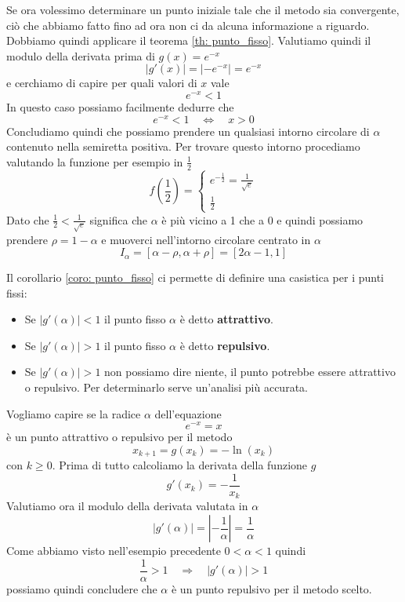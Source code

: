 \begin{example}
	Se ora volessimo determinare un punto iniziale tale che il metodo sia convergente, ciò che abbiamo fatto
	fino ad ora non ci da alcuna informazione a riguardo. Dobbiamo quindi applicare il teorema
	\ref{th: punto_fisso}. Valutiamo quindi il modulo della derivata prima di $g(x) = e^{-x}$
	\[ |g'(x)| = |-e^{-x}| = e^{-x} \]
	e cerchiamo di capire per quali valori di $x$ vale
	\[ e^{-x} < 1 \]
	In questo caso possiamo facilmente dedurre che
	\[ e^{-x} < 1 \quad \Leftrightarrow \quad x > 0 \]
	Concludiamo quindi che possiamo prendere un qualsiasi intorno circolare di $\alpha$ contenuto nella semiretta
	positiva. Per trovare questo intorno procediamo valutando la funzione per esempio in $\frac{1}{2}$
	\[
		f \left( \frac{1}{2} \right) = \begin{cases}
			e^{-\frac{1}{2}} = \frac{1}{\sqrt{e}} \\
			\frac{1}{2}
		\end{cases}
	\]
	Dato che $\frac{1}{2} < \frac{1}{\sqrt{e}}$ significa che $\alpha$ è più vicino a 1 che a 0 e quindi possiamo
	prendere $\rho = 1 - \alpha$ e muoverci nell'intorno circolare centrato in $\alpha$
	\[ I_\alpha = [\alpha - \rho, \alpha + \rho] = [2\alpha - 1, 1] \]
\end{example}

\begin{definition}
	Il corollario \ref{coro: punto_fisso} ci permette di definire una casistica per i punti fissi:
	\begin{itemize}
		\item Se $|g'(\alpha)| < 1$ il punto fisso $\alpha$ è detto \textbf{attrattivo}.
		\item Se $|g'(\alpha)| > 1$ il punto fisso $\alpha$ è detto \textbf{repulsivo}.
		\item Se $|g'(\alpha)| > 1$ non possiamo dire niente, il punto potrebbe essere attrattivo o repulsivo. Per
		      determinarlo serve un'analisi più accurata.
	\end{itemize}
\end{definition}

\begin{example}
	Vogliamo capire se la radice $\alpha$ dell'equazione
	\[ e^{-x} = x \]
	è un punto attrattivo o repulsivo per il metodo
	\[ x_{k+1} = g(x_k) = -\ln (x_k) \]
	con $k \geq 0$. Prima di tutto calcoliamo la derivata della funzione $g$
	\[ g'(x_k) = -\frac{1}{x_k} \]
	Valutiamo ora il modulo della derivata valutata in $\alpha$
	\[ |g'(\alpha)| = \left| -\frac{1}{\alpha} \right| = \frac{1}{\alpha} \]
	Come abbiamo visto nell'esempio precedente $0 < \alpha < 1$ quindi
	\[ \frac{1}{\alpha} > 1 \quad \Rightarrow \quad |g'(\alpha)| > 1 \]
	possiamo quindi concludere che $\alpha$ è un punto repulsivo per il metodo scelto.
\end{example}
